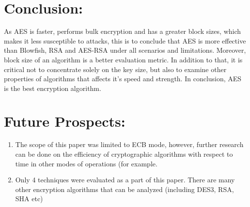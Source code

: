 \documentclass[a4paper]{report} %
\begin{document}
\section{Conclusion:}
As AES is faster, performs bulk encryption and has a greater block sizes, which makes it less susceptible to attacks, this is to conclude that AES is more effective than Blowfish, RSA and AES-RSA under all scenarios and limitations. Moreover, block size of an algorithm is a better evaluation metric. In addition to that, it is critical not to concentrate solely on the key size, but also to examine other properties of algorithms that affects it's speed and strength. In conclusion, AES is the best encryption algorithm.

\section{Future Prospects:}
\begin{enumerate}
    \item The scope of this paper was limited to ECB mode, however, further research can be done on the efficiency of cryptographic algorithms with respect to time in other modes of operations (for example. 
    \item Only 4 techniques were evaluated as a part of this paper. There are many other encryption algorithms that can be analyzed (including DES3, RSA, SHA etc) 
    
\end{enumerate}


\end{document}
